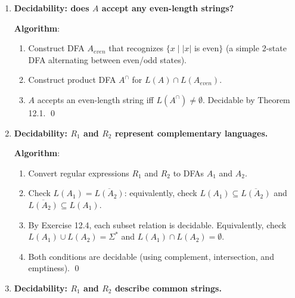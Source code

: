 \begin{enumerate}[{12.}1. ]
\textbf{Algorithm} (using the pumping lemma and DFA structure):
- By Theorem 12.2 (pumping lemma), $L(A)$ is infinite iff $L(A)$ contains a string of length $n \leq k < 2n$ (where $n=|S|$).
- For strings of length $> 1228$: if $|S| \leq 1228$, enumerate all strings of length $n$ to $2n-1$ and check if any is in $L(A)$ (finitely many checks). If $L(A)$ contains such a string, it also contains strings of length $>1228$.
- More directly: compute $\{\DBAR(s_0,y)\mid |y|=1229\}$ (reachable states at depth $1229$) by BFS. If any final state is reachable at depth $>1228$ (specifically, any path of length $>1228$ reaches a final state), the answer is yes. BFS on the DFA graph answers this. \qed

\item \textbf{Decidability: does $A$ accept any even-length strings?}

\textbf{Algorithm}:
\begin{enumerate}
\item Construct DFA $A_{even}$ that recognizes $\{x \mid |x|$ is even$\}$ (a simple 2-state DFA alternating between even/odd states).
\item Construct product DFA $A^\cap$ for $L(A)\cap L(A_{even})$.
\item $A$ accepts an even-length string iff $L(A^\cap)\neq\emptyset$. Decidable by Theorem 12.1. \qed
\end{enumerate}

\item \textbf{Decidability: $R_1$ and $R_2$ represent complementary languages.}

\textbf{Algorithm}:
\begin{enumerate}
\item Convert regular expressions $R_1$ and $R_2$ to DFAs $A_1$ and $A_2$.
\item Check $L(A_1) = \overline{L(A_2)}$: equivalently, check $L(A_1)\subseteq\overline{L(A_2)}$ and $\overline{L(A_2)}\subseteq L(A_1)$.
\item By Exercise 12.4, each subset relation is decidable. Equivalently, check $L(A_1) \cup L(A_2) = \Sigma^*$ and $L(A_1)\cap L(A_2)=\emptyset$.
\item Both conditions are decidable (using complement, intersection, and emptiness). \qed
\end{enumerate}

\item \textbf{Decidability: $R_1$ and $R_2$ describe common strings.}


\end{enumerate}
